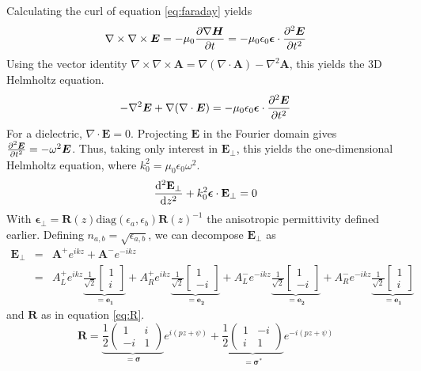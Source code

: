 Calculating the curl of equation \ref{eq:faraday} yields
\begin{equation}
\nabla \times \nabla \times\bm{E} = -\mu_0\pdv{\nabla\bm{H}}{t} = -\mu_0\epsilon_0\bm{\epsilon}\cdot\pdv[2]{\bm{E}}{t}
\end{equation} 
%
Using the vector identity $\nabla\times\nabla\times \bm{A} = \nabla(\nabla\cdot\bm{A}) - \nabla^2\bm{A}$, this yields the 3D Helmholtz equation.
\begin{equation}
-\nabla^2\bm{E} + \nabla(\nabla\cdot\bm{E}) = -\mu_0\epsilon_0\bm{\epsilon}\cdot\pdv[2]{\bm{E}}{t}
\end{equation}
%
For a dielectric, $\nabla\cdot\bm{E}=0$. Projecting $\bm{E}$ in the Fourier domain gives $\pdv[2]{\bm{E}}{t}=-\omega^2\bm{E}$. Thus, taking only interest in $\bm{E}_\perp$, this yields the one-dimensional Helmholtz equation, where $k_0^2=\mu_0\epsilon_0\omega^2$.
\begin{equation}
	\dv[2]{\mathbf{E}_\perp}{z} + k_0^2 \bm{\epsilon}\cdot\mathbf{E}_\perp = 0 \label{eq:helmholtz}
\end{equation}
%
With $\bm{\epsilon}_\perp = \mathbf{R}(z)\text{diag}(\epsilon_a, \epsilon_b)\mathbf{R}(z)^{-1}$ the anisotropic permittivity defined earlier. Defining $n_{a,b}=\sqrt{\epsilon_{a,b}}$, we can decompose $\mathbf{E}_\perp$ as 
\begin{eqnarray}
	\mathbf{E}_\perp &=& \mathbf{A^+}e^{ikz} + \mathbf{A^-}e^{-ikz}\\
	&=&   A_L^+e^{ikz} \underbrace{\frac{1}{\sqrt{2}}\begin{bmatrix}1\\i\end{bmatrix}}_{=\mathbf{e_1}} + A_R^+e^{ikz} \underbrace{\frac{1}{\sqrt{2}}\begin{bmatrix}1\\-i\end{bmatrix}}_{=\mathbf{e_2}} + A_L^-e^{-ikz} \underbrace{\frac{1}{\sqrt{2}}\begin{bmatrix}1\\-i\end{bmatrix}}_{=\mathbf{e_2}} + A_R^-e^{-ikz} \underbrace{\frac{1}{\sqrt{2}}\begin{bmatrix}1\\i\end{bmatrix}}_{=\mathbf{e_1}} 
\end{eqnarray}
and $\mathbf{R}$ as in equation \ref{eq:R}.
\begin{equation}
	\mathbf{R} = \underbrace{\frac{1}{2}\begin{pmatrix}1&i\\-i&1\end{pmatrix}}_{=\bm{\sigma}}e^{i(pz + \psi)} + \underbrace{\frac{1}{2}\begin{pmatrix}1&-i\\i&1\end{pmatrix}}_{=\bm{\sigma}^*}e^{-i(pz+\psi)} \label{eq:R}
\end{equation}

